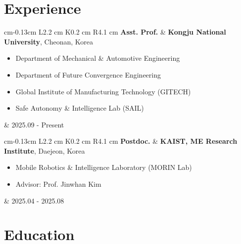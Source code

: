 \documentclass[10pt, letterpaper]{article}
\newenvironment{highlights}{
        \begin{itemize}[
                topsep=0pt,
                parsep=0.10 cm,
                partopsep=0pt,
                itemsep=0pt,
                after=\vspace{-1\baselineskip},
                leftmargin=0.4 cm + 3pt
            ]
    }{
        \end{itemize}
    } %
\let\originalTabularx\tabularx
\let\originalEndTabularx\endtabularx
\renewenvironment{tabularx}{\bgroup\centering\originalTabularx}{\originalEndTabularx\par\egroup}
\begin{document}
    \section{Experience}
        \begin{tabularx}
        {
             cm-0.13cm
        }
        {
            L{2.2 cm}
            K{0.2 cm}
            R{4.1 cm}
        }
        \textbf{Asst. Prof.}
        &
        \textbf{Kongju National University}, Cheonan, Korea
        \vspace{0.10 cm}
        \begin{highlights}
            \item {Department of Mechanical \& Automotive Engineering}
            \item {Department of Future Convergence Engineering}
            \item {Global Institute of Manufacturing Technology (GITECH)}
            \item {Safe Autonomy \& Intelligence Lab (SAIL)}
        \end{highlights}
        &
        2025.09 - Present
        \end{tabularx}

        \vspace{0.2 cm}

        \begin{tabularx}
        {
             cm-0.13cm
        }
        {
            L{2.2 cm}
            K{0.2 cm}
            R{4.1 cm}
        }
        \textbf{Postdoc.}
        &
        \textbf{KAIST, ME Research Institute}, Daejeon, Korea
        \vspace{0.10 cm}
        \begin{highlights}
            \item {Mobile Robotics \& Intelligence Laboratory (MORIN Lab)} 
            \item {Advisor: Prof. Jinwhan Kim} 
        \end{highlights}
        &
        2025.04 - 2025.08
        \end{tabularx}
    
    \section{Education}
\end{document}
